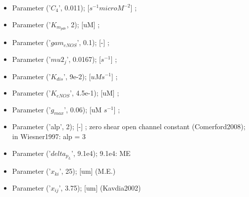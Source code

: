 \documentclass[fleqn]{report}
\numberwithin{equation}{section}
\numberwithin{equation}{section}
\begin{document}
\begin{itemize}
    \item  Parameter   ('$C_4$', 0.011);  [$s^{-1} microM^{-2}$] ;\\
    \item  Parameter   ('$K_{m_{pde}}$, 2);  [uM] ;\\
    \item  Parameter   ('$gam_{eNOS}$', 0.1);  [-] ;\\
    \item  Parameter   ('$mu2_j$', 0.0167);  [$s^{-1}$] ;\\
    \item  Parameter   ('$K_{dis}$', 9e-2);  [$uM s^{-1}$] ;\\
    \item  Parameter   ('$K_{eNOS}$', 4.5e-1);  [uM] ;    \\
    \item Parameter   ('$g_{max}$', 0.06);  [uM $s^{-1}$] ;    \\
    \item  Parameter   ('alp', 2);  [-] ; zero shear open channel constant (Comerford2008); in Wiesner1997: alp = 3\\
    \item  Parameter   ('$delta_{p_{L}}$', 9.1e4);  9.1e4: ME\\
    \item  Parameter   ('$x_{ki}$', 25);  [um]  (M.E.)\\
    \item  Parameter   ('$x_{ij}$', 3.75);  [um]  (Kavdia2002)\\
\end{itemize}

\end{document}
